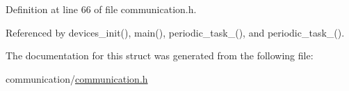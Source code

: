 Definition at line 66 of file communication.\-h.



Referenced by devices\-\_\-init(), main(), periodic\-\_\-task\-\_(), and periodic\-\_\-task\-\_().



The documentation for this struct was generated from the following file\-:\begin{DoxyCompactItemize}
\item 
communication/\hyperlink{communication_2communication_8h}{communication.\-h}\end{DoxyCompactItemize}
